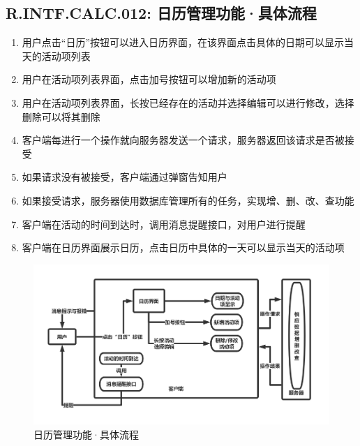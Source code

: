     \subsection{R.INTF.CALC.012: 日历管理功能·具体流程}
    \begin{enumerate}
        \item 用户点击“日历”按钮可以进入日历界面，在该界面点击具体的日期可以显示当天的活动项列表
        \item 用户在活动项列表界面，点击加号按钮可以增加新的活动项
        \item 用户在活动项列表界面，长按已经存在的活动并选择编辑可以进行修改，选择删除可以将其删除
        \item 客户端每进行一个操作就向服务器发送一个请求，服务器返回该请求是否被接受
        \item 如果请求没有被接受，客户端通过弹窗告知用户
        \item 如果接受请求，服务器使用数据库管理所有的任务，实现增、删、改、查功能
        \item 客户端在活动的时间到达时，调用消息提醒接口，对用户进行提醒
        \item 客户端在日历界面展示日历，点击日历中具体的一天可以显示当天的活动项
    \end{enumerate}
        \begin{figure}[h]
            \centering
            \includegraphics[scale=0.4]{OutlineDesign/figures/日历管理功能·具体流程.png}
            \caption{日历管理功能·具体流程}
            \label{fig:server_flow}
        \end{figure}
